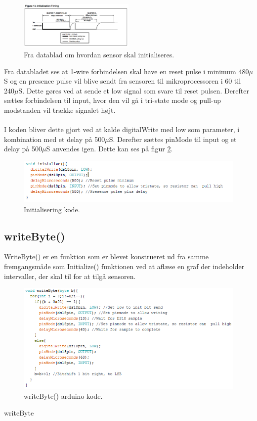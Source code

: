 \begin{figure}[h!]
  \centering
  \includegraphics[width=0.5\textwidth]{figures/Initialization_timing.png}
  \caption{Fra datablad om hvordan sensor skal initialiseres.}
  \label{sensor_kom}
\end{figure}

Fra databladet ses at 1-wire forbindelsen skal have en reset pulse i minimum 480$\mu$S og en presence pulse vil blive sendt fra sensoren til mikroprocessoren i 60 til 240$\mu$S. Dette gøres ved at sende et low signal som svare til reset pulsen. Derefter sættes forbindelsen til input, hvor den vil gå i tri-state mode og pull-up modstanden vil trække signalet højt. 
\\
\\
I koden bliver dette gjort ved at kalde digitalWrite med low som parameter, i kombination med et delay på 500$\mu$S. Derefter sættes pinMode til input og et delay på 500$\mu$S anvendes igen. Dette kan ses på figur \ref{sensor_kode}.

\begin{figure}[h!]
  \centering
  \includegraphics[width=1\textwidth]{figures/Init.png}
  \caption{Initialisering kode.}
  \label{sensor_kode}
\end{figure}


\subsection{writeByte()}
WriteByte() er en funktion som er blevet konstrueret ud fra samme fremgangsmåde som Initialize() funktionen ved at aflæse en graf der indeholder intervaller, der skal til for at tilgå sensoren.

\begin{figure}[h!]
  \centering
  \includegraphics[width=1\textwidth]{figures/write_byte.png}
  \caption{writeByte() arduino kode.}
  \label{write_byte}
\end{figure}

writeByte 